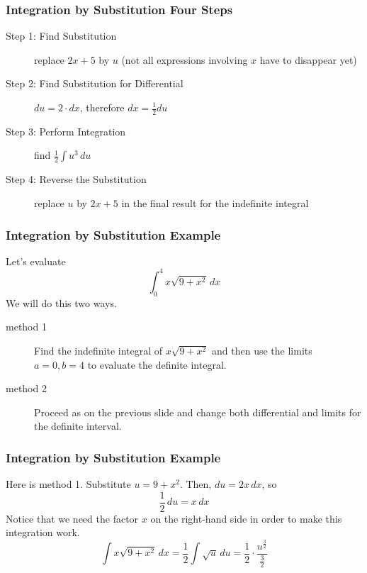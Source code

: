 \documentclass[xcolor=dvipsnames]{beamer}
\begin{document}
\begin{frame}
  \frametitle{Integration by Substitution Four Steps}
  \begin{description}
  \item[Step 1: Find Substitution] replace $2x+5$ by $u$ (not all
    expressions involving $x$ have to disappear yet)
  \item[Step 2: Find Substitution for Differential]
    $du=2\cdot{}dx$, therefore $dx=\frac{1}{2}du$
  \item[Step 3: Perform Integration] find $\frac{1}{2}\int{}u^{3}\,du$
  \item[Step 4: Reverse the Substitution] replace $u$ by $2x+5$ in
    the final result for the indefinite integral
  \end{description}
\end{frame}

\begin{frame}
  \frametitle{Integration by Substitution Example}
   Let's evaluate
  \begin{equation}
    \label{eq:eenoophu}
   \int_{0}^{4}x\sqrt{9+x^{2}}\,dx 
  \end{equation}
  We will do this two ways. 
  \begin{description}
  \item[method 1] Find the indefinite integral of $x\sqrt{9+x^{2}}$
    and then use the limits $a=0,b=4$ to evaluate the definite
    integral.
  \item[method 2] Proceed as on the previous slide and change both
    differential \alert{and} limits for the definite interval.
  \end{description}
\end{frame}

\begin{frame}
  \frametitle{Integration by Substitution Example}
  Here is method 1. Substitute $u=9+x^{2}$. Then, $du=2x\,dx$, so
\begin{equation}
  \label{eq:iachuejo}
  \frac{1}{2}\,du=x\,dx
\end{equation}
Notice that we need the factor $x$ on the right-hand side in order to
make this integration work.
\begin{equation}
  \label{eq:diacheiv}
  \int{}x\sqrt{9+x^{2}}\,dx=\frac{1}{2}\int{}\sqrt{u}\,du=\frac{1}{2}\cdot\frac{u^{\frac{3}{2}}}{\frac{3}{2}}
\end{equation}
\end{frame}
\end{document}

